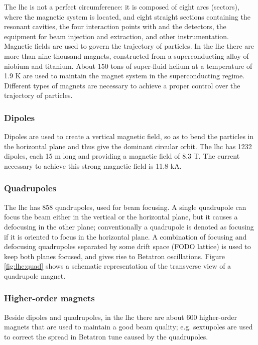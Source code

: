 The \gls{lhc} is not a perfect circumference: it is composed of eight arcs (sectors), where the magnetic system is located, and eight straight sections containing the resonant cavities, the four interaction points with and the detectors, the equipment for beam injection and extraction, and other instrumentation. Magnetic fields are used to govern the trajectory of particles. In the \gls{lhc} there are more than nine thousand magnets, constructed from a superconducting alloy of niobium and titanium. About 150 tons of super-fluid helium at a temperature of 1.9 K are used to maintain the magnet system in the superconducting regime. Different types of magnets are necessary to achieve a proper control over the trajectory of particles.

\subsubsection*{Dipoles} 
Dipoles are used to create a vertical magnetic field, so as to bend the particles in the horizontal plane and thus give the dominant circular orbit. The \gls{lhc} has 1232 dipoles, each 15 m long and providing a magnetic field of 8.3 T. The current necessary to achieve this strong magnetic field is 11.8 kA.


\subsubsection*{Quadrupoles}
The \gls{lhc} has 858 quadrupoles, used for beam focusing. A single quadrupole can focus the beam either in the vertical or the horizontal plane, but it causes a defocusing in the other plane; conventionally a quadrupole is denoted as focusing if it is oriented to focus in the horizontal plane. A combination of focusing and defocusing quadrupoles separated by some drift space (FODO lattice) is used to keep both planes focused, and gives rise to Betatron oscillations. Figure \ref{fig:lhc:quad} shows a schematic representation of the transverse view of a quadrupole magnet.

\subsubsection*{Higher-order magnets} 
Beside dipoles and quadrupoles, in the \gls{lhc} there are about 600 higher-order magnets that are used to maintain a good beam quality; e.g.  sextupoles are used to correct the spread in Betatron tune caused by the quadrupoles.




